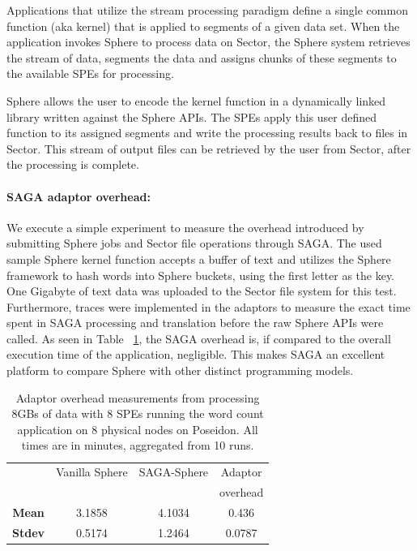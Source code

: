 \documentclass[3p,twocolumn]{elsarticle}
\begin{document}
Applications that utilize the stream processing paradigm define a
single common function (aka kernel) that is applied to segments of a
given data set.  When the application invokes Sphere to process data
on Sector, the Sphere system retrieves the stream of data, segments
the data and assigns chunks of these segments to the available SPEs
for processing.

Sphere allows the user to encode the kernel function in a dynamically
linked library written against the Sphere APIs.  The SPEs apply this
user defined function to its assigned segments and write the
processing results back to files in Sector.  This stream of output
files can be retrieved by the user from Sector, after the processing
is complete. 


\paragraph{SAGA adaptor overhead:}
\label{ssec:overhead}

We execute a simple experiment to measure the overhead introduced by
submitting Sphere jobs and Sector file operations through SAGA.  The
used sample Sphere kernel function accepts a buffer of text and
utilizes the Sphere framework to hash words into Sphere buckets, using
the first letter as the key. One Gigabyte of text data was uploaded to
the Sector file system for this test.  Furthermore, traces were
implemented in the adaptors to measure the exact time spent in SAGA
processing and translation before the raw Sphere APIs were called.  As
seen in Table ~\ref{tab:sphere_overhead}, the SAGA overhead is, if compared
to the overall execution time of the application, negligible.
This makes SAGA an excellent platform to compare Sphere with other distinct
programming models.

\begin{table}[h!]
  \footnotesize
  \begin{tabular}{cccc}
    \hline
    & Vanilla Sphere &  SAGA-Sphere & Adaptor \\
    &                &              & overhead \\
    \hline
    { {\bf Mean}} & 3.1858 & 4.1034 & 0.436 \\
    \hline 
    { {\bf Stdev}} & 0.5174 & 1.2464 & 0.0787 \\
    \hline \hline
  \end{tabular}
  \caption{Adaptor overhead measurements from processing 8GBs of data with 8
  SPEs running the word count application on 8 physical nodes on Poseidon.
  All times are in minutes, aggregated from 10 runs.\uppp
  \label{tab:sphere_overhead}}
\end{table}
\end{document}
